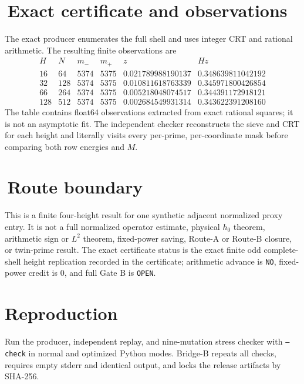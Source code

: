\documentclass[11pt]{article}
\begin{document}
\section{\,Exact certificate and observations}
The exact producer enumerates the full shell and uses integer CRT and
rational arithmetic.  The resulting finite observations are
\[
\begin{array}{c|r|r|r|c|c}
H&N&m_-&m_+&z&Hz\\ \hline
16&64&5374&5375&0.021789988190137&0.348639811042192\\
32&128&5374&5375&0.010811618763339&0.345971800426854\\
66&264&5374&5375&0.005218048074517&0.344391172918121\\
128&512&5374&5375&0.002684549931314&0.343622391208160
\end{array}
\]
The table contains float64 observations extracted from exact rational
squares; it is not an asymptotic fit.  The independent checker reconstructs
the sieve and CRT for each height and literally visits every per-prime,
per-coordinate mask before comparing both row energies and $M$.

\section{\,Route boundary}
This is a finite four-height result for one synthetic adjacent normalized
proxy entry.  It is not a full normalized operator estimate, physical
$h_0$ theorem, arithmetic sign or $L^2$ theorem, fixed-power saving,
Route-A or Route-B closure, or twin-prime result.  The exact certificate
status is the exact finite odd complete-shell height replication recorded in
the certificate;
arithmetic advance is \texttt{NO}, fixed-power credit is $0$, and full Gate B
is \texttt{OPEN}.

\section*{Reproduction}
Run the producer, independent replay, and nine-mutation stress checker with
\texttt{--check} in normal and optimized Python modes.  Bridge-B repeats all
checks, requires empty stderr and identical output, and locks the release
artifacts by SHA-256.
\end{document}
